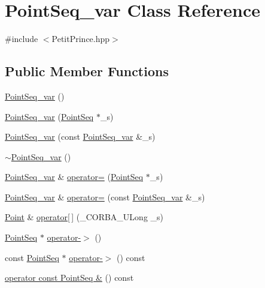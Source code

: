 \hypertarget{class_point_seq__var}{}\section{Point\+Seq\+\_\+var Class Reference}
\label{class_point_seq__var}


{\ttfamily \#include $<$Petit\+Prince.\+hpp$>$}

\subsection*{Public Member Functions}
\begin{DoxyCompactItemize}
\item 
\hyperlink{class_point_seq__var_ade5b87a563dd971ebfa7d6df565ba09c}{Point\+Seq\+\_\+var} ()
\item 
\hyperlink{class_point_seq__var_a091069be563cbd093e0f3dbd5b231983}{Point\+Seq\+\_\+var} (\hyperlink{class_point_seq}{Point\+Seq} $\ast$\+\_\+s)
\item 
\hyperlink{class_point_seq__var_a7ee6840d223cc06703137bb478fdd08c}{Point\+Seq\+\_\+var} (const \hyperlink{class_point_seq__var}{Point\+Seq\+\_\+var} \&\+\_\+s)
\item 
\hyperlink{class_point_seq__var_a96100fe6fbb954d0e0885dcd358d0ce9}{$\sim$\+Point\+Seq\+\_\+var} ()
\item 
\hyperlink{class_point_seq__var}{Point\+Seq\+\_\+var} \& \hyperlink{class_point_seq__var_a5333b047cfddae0ecc8fe94d6a3994b2}{operator=} (\hyperlink{class_point_seq}{Point\+Seq} $\ast$\+\_\+s)
\item 
\hyperlink{class_point_seq__var}{Point\+Seq\+\_\+var} \& \hyperlink{class_point_seq__var_a5d3ba84321b566bdff57563f3bc1cf2c}{operator=} (const \hyperlink{class_point_seq__var}{Point\+Seq\+\_\+var} \&\+\_\+s)
\item 
\hyperlink{struct_point}{Point} \& \hyperlink{class_point_seq__var_aed4155007654afed5d5c3656033fce3f}{operator\mbox{[}$\,$\mbox{]}} (\+\_\+\+C\+O\+R\+B\+A\+\_\+\+U\+Long \+\_\+s)
\item 
\hyperlink{class_point_seq}{Point\+Seq} $\ast$ \hyperlink{class_point_seq__var_a50c96b2b4be52a32f452229f4016ae82}{operator-\/$>$} ()
\item 
const \hyperlink{class_point_seq}{Point\+Seq} $\ast$ \hyperlink{class_point_seq__var_a882ebff299929662248f56f86087873b}{operator-\/$>$} () const 
\item 
\hyperlink{class_point_seq__var_aa4678a4b5c87044e1cabd1e57e8e3c2e}{operator const Point\+Seq \&} () const 

\end{DoxyCompactItemize}
